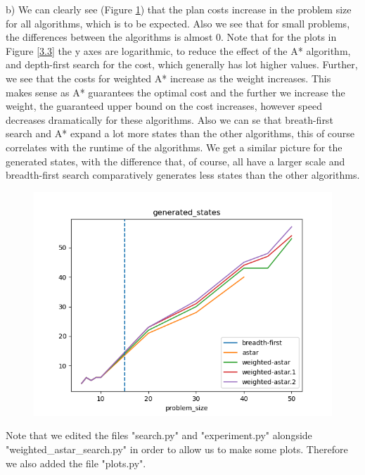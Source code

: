 \documentclass[12pt]{article}
\begin{document}
b) We can clearly see (Figure \ref{3.4}) that the plan costs increase in the problem size for all algorithms, which is to be expected. Also we see that for small problems, the differences between the algorithms is almost 0. Note that for the plots in Figure \ref{3.3} the y axes are logarithmic, to reduce the effect of the A* algorithm, and depth-first search for the cost, which generally has lot higher values. Further, we see that the costs for weighted A* increase as the weight increases. This makes sense as A* guarantees the optimal cost and the further we increase the weight, the guaranteed upper bound on the cost increases, however speed decreases dramatically for these algorithms. Also we can se that breath-first search and A* expand a lot more states than the other algorithms, this of course correlates with the runtime of the algorithms. We get a similar picture for the generated states, with the difference that, of course, all have a larger scale and breadth-first search comparatively generates less states than the other algorithms.


\begin{figure}
    \centering
    \includegraphics[width=.6\textwidth]{figures/generated_states_without_dfs.png}
    \caption{}
    \label{3.4}
\end{figure}

Note that we edited the files "search.py" and "experiment.py" alongside "weighted\_astar\_search.py" in order to allow us to make some plots. Therefore we also added the file "plots.py". 
\end{document}
